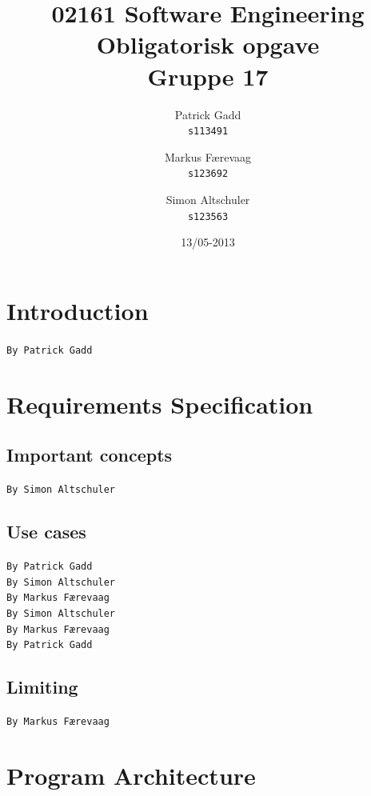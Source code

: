 \documentclass[danish]{article}
\author{
  Patrick Gadd\\
  \texttt{s113491}
  \and
  Markus Færevaag\\
  \texttt{s123692}
  \and
  Simon Altschuler\\
  \texttt{s123563}
}
\title{02161 Software Engineering\\
  Obligatorisk opgave\\
Gruppe 17}
\date{13/05-2013}
\begin{document}
\maketitle
\clearpage

\section{Introduction}
\texttt{By Patrick Gadd}\\


\section{Requirements Specification}
\label{requirements}
\subsection{Important concepts}
\texttt{By Simon Altschuler}\\


\subsection{Use cases}

\texttt{By Patrick Gadd}\\

\texttt{By Simon Altschuler}\\

\texttt{By Markus Færevaag}\\

\texttt{By Simon Altschuler}\\

\texttt{By Markus Færevaag}\\

\texttt{By Patrick Gadd}\\

\subsection{Limiting}
\texttt{By Markus Færevaag}\\


\section{Program Architecture}
\label{architecture}
\end{document}
